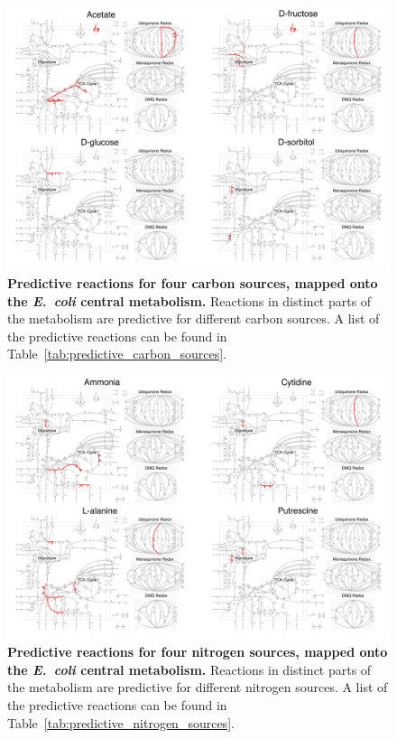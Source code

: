 \documentclass[12pt]{article}
\begin{document}
\clearpage
\begin{figure}[p]
\centerline{\includegraphics[width=7in]{Figures/carbon/carbon_grid.pdf}}
\caption{\label{fig:carbon_network}\textbf{Predictive reactions for four carbon sources, mapped onto the \emph{E.\ coli} central metabolism.} Reactions in distinct parts of the metabolism are predictive for different carbon sources. A list of the predictive reactions can be found in Table~\ref{tab:predictive_carbon_sources}.}
\end{figure}

\clearpage
\begin{figure}[p]
\centerline{\includegraphics[width=7in]{Figures/nitrogen/nitrogen_grid.pdf}}
\caption{\label{fig:nitrogen_network}\textbf{Predictive reactions for four nitrogen sources, mapped onto the \emph{E.\ coli} central metabolism.} Reactions in distinct parts of the metabolism are predictive for different nitrogen sources. A list of the predictive reactions can be found in Table~\ref{tab:predictive_nitrogen_sources}.}
\end{figure}
\end{document}
